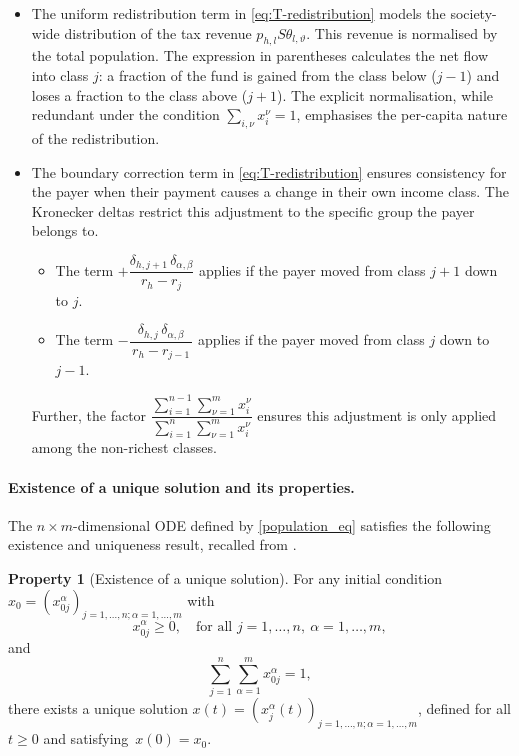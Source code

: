 \documentclass[11pt]{article}
\theoremstyle{plain}
\theoremstyle{definition}
\newtheorem{property}{Property}
\newcommand{\1}{\mathbf{1}}
\begin{document}
\begin{itemize}
  \item[a.] The uniform redistribution term in \eqref{eq:T-redistribution} models the society-wide distribution of the tax revenue $p_{h,l}S\theta_{l,\vartheta}$. This revenue is normalised by the total population. The expression in parentheses calculates the net flow into class $j$: a fraction of the fund is gained from the class below ($j-1$) and loses a fraction to the class above ($j+1$). The explicit normalisation, while redundant under the condition $\sum_{i,\nu}x_i^\nu=1$, emphasises the per-capita nature of the redistribution.

  \item[b.] The boundary correction term in \eqref{eq:T-redistribution} ensures consistency for the payer when their payment causes a change in their own income class. The Kronecker deltas restrict this adjustment to the specific group the payer belongs to.
    \begin{itemize}
      \item[$\bullet$] The term $ +\dfrac{\delta_{h,j+1}\,\delta_{\alpha,\beta}}{\,r_h-r_j\,} $ applies if the payer moved from class $j+1$ down to $j$.
      \item[$\bullet$] The term $ -\dfrac{\delta_{h,j}\,\delta_{\alpha,\beta}}{\,r_h-r_{j-1}\,} $ applies if the payer moved from class $j$ down to $j-1$.
    \end{itemize}
  Further, the factor $\dfrac{\sum_{i=1}^{n-1} \sum_{\nu=1}^{m} x_i^\nu}{\sum_{i=1}^{n} \sum_{\nu=1}^{m} x_i^\nu}$ ensures this adjustment is only applied among the non-richest classes.
\end{itemize}

\paragraph{Existence of a unique solution and its properties.}

The $n\times m$-dimensional ODE defined by \eqref{population_eq} satisfies the following existence and uniqueness result, recalled from  \cite{bertotti2018mathematical}. 

\begin{property}[Existence of a unique solution]
 \label{prop0}
For any initial condition 
${x}_0 = (x^{\alpha}_{0j})_{j=1,\ldots,n;\alpha=1,\ldots,m}$ with 
\begin{equation*}
    x^{\alpha}_{0j} \geq 0, \quad \text{for all } j=1,\ldots,n, \ \alpha=1,\ldots,m,
\end{equation*}
and 
\begin{equation*}
    \sum_{j=1}^{n}\sum_{\alpha=1}^{m}x^{\alpha}_{0j}=1,
\end{equation*}
there exists a unique solution ${x}(t)=(x_j^\alpha(t))_{j=1,\ldots,n;\alpha=1,\ldots,m}$, defined for all $t \geq 0$ and satisfying~$x(0)=x_0$.
\end{property}
\end{document}
